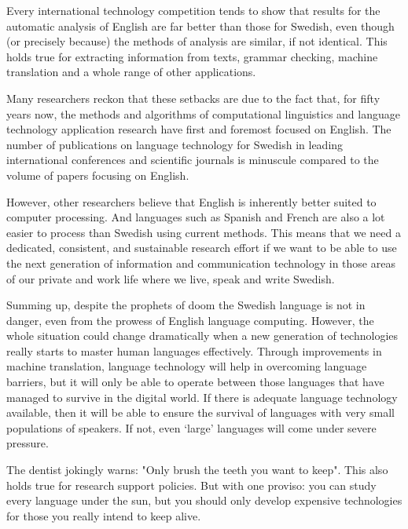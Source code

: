 \begin{multicols}{2}
Every international technology competition tends to show that results
for the automatic analysis of \mbox{English} are far better than those for
Swedish, even though (or precisely because) the methods of \mbox{analysis}
are similar, if not identical. This holds true for extracting
information from texts, grammar checking, machine translation and a
whole range of other applications.

Many researchers reckon that these setbacks are due to the fact that,
for fifty years now, the methods and algorithms of computational
linguistics and lang\-uage technology application research have first
and foremost focused on English. The number of publications on
language technology for Swedish in leading international conferences
and scientific journals is minuscule compared to the volume of \mbox{papers}
focus\-ing on English.
 
However, other researchers believe that English is inherently better
suited to computer processing. And languages such as Spanish and
French are also a lot easier to process than Swedish using current
methods. This means that we need a dedicated, consistent, and
sustainable research effort if we want to be able to use the next
generation of information and communication technology in those areas
of our \mbox{private} and work life where we live, speak and write Swedish.

Summing up, despite the prophets of doom the Swedish language is not in
danger, even from the prowess of English language computing. However,
the whole situation could change dramatically when a new generation of
technologies really starts to master human languages
effectively. Through improvements in machine translation, language
technology will help in overcoming language barriers, but it will only
be able to operate between those languages that have managed to
survive in the digital world. If there is adequate language technology
available, then it will be able to ensure the survival of languages
with very small populations of speakers. If not, even ‘large’
languages will come under severe pressure.

The dentist jokingly warns: "Only brush the teeth you want to
keep". This also holds true for research support policies. But with
one proviso: you can study every language under the sun, but you
should only develop expensive technologies for those you really intend
to keep alive.

\end{multicols}

\clearpage

